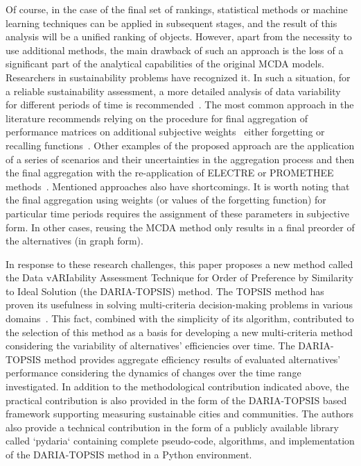 \documentclass[final,5p,times,twocolumn,authoryear]{elsarticle}
\newcounter{example}[section]
\begin{document}
Of course, in the case of the final set of rankings, statistical methods or machine learning techniques can be applied in subsequent stages, and the result of this analysis will be a unified ranking of objects. However, apart from the necessity to use additional methods, the main drawback of such an approach is the loss of a significant part of the analytical capabilities of the original MCDA models. Researchers in sustainability problems have recognized it. In such a situation, for a reliable sustainability assessment, a more detailed analysis of data variability for different periods of time is recommended~\citep{martins2021multidimensional}. The most common approach in the literature recommends relying on the procedure for final aggregation of performance matrices on additional subjective weights~\citep{banamar2018extension, urli2019promethee} either forgetting or recalling functions~\citep{watrobski2016multistage, karczmarczyk2018comparative}. Other examples of the proposed approach are the application of a series of scenarios and their uncertainties in the aggregation process and then the final aggregation with the re-application of ELECTRE or PROMETHEE methods~\citep{frini2018making, frini2020temporal, martins2021multidimensional}. Mentioned approaches also have shortcomings. It is worth noting that the final aggregation using weights (or values of the forgetting function) for particular time periods requires the assignment of these parameters in subjective form. In other cases, reusing the MCDA method only results in a final preorder of the alternatives (in graph form).

In response to these research challenges, this paper proposes a new method called the Data vARIability Assessment Technique for Order of Preference by Similarity to Ideal Solution (the DARIA-TOPSIS) method. The TOPSIS method has proven its usefulness in solving multi-criteria decision-making problems in various domains~\citep{behzadian2012state}. This fact, combined with the simplicity of its algorithm, contributed to the selection of this method as a basis for developing a new multi-criteria method considering the variability of alternatives’ efficiencies over time. The DARIA-TOPSIS method provides aggregate efficiency results of evaluated alternatives’ performance considering the dynamics of changes over the time range investigated. In addition to the methodological contribution indicated above, the practical contribution is also provided in the form of the DARIA-TOPSIS based framework supporting measuring sustainable cities and communities. The authors also provide a technical contribution in the form of a publicly available library called `pydaria` containing complete pseudo-code, algorithms, and implementation of the DARIA-TOPSIS method in a Python environment.
\end{document}
